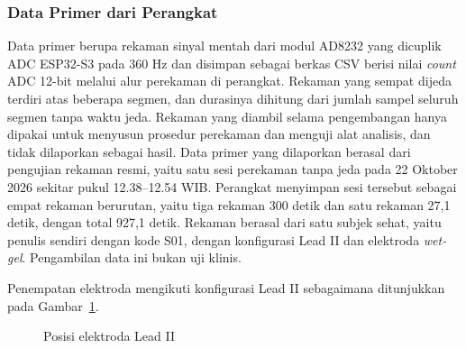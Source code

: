 \subsubsection{Data Primer dari Perangkat}

Data primer berupa rekaman sinyal mentah dari modul AD8232 yang dicuplik ADC ESP32-S3 pada 360 Hz dan disimpan sebagai berkas CSV berisi nilai \textit{count} ADC 12-bit melalui alur perekaman di perangkat. Rekaman yang sempat dijeda terdiri atas beberapa segmen, dan durasinya dihitung dari jumlah sampel seluruh segmen tanpa waktu jeda. Rekaman yang diambil selama pengembangan hanya dipakai untuk menyusun prosedur perekaman dan menguji alat analisis, dan tidak dilaporkan sebagai hasil. Data primer yang dilaporkan berasal dari pengujian rekaman resmi, yaitu satu sesi perekaman tanpa jeda pada 22 Oktober 2026 sekitar pukul 12.38--12.54 WIB. Perangkat menyimpan sesi tersebut sebagai empat rekaman berurutan, yaitu tiga rekaman 300 detik dan satu rekaman 27,1 detik, dengan total 927,1 detik. Rekaman berasal dari satu subjek sehat, yaitu penulis sendiri dengan kode S01, dengan konfigurasi Lead II dan elektroda \textit{wet-gel}. Pengambilan data ini bukan uji klinis.

Penempatan elektroda mengikuti konfigurasi Lead II sebagaimana ditunjukkan pada Gambar~\ref{fig:4-elektroda}.

\begin{figure}[!ht]
  \centering
  \caption{Posisi elektroda Lead II}
  \label{fig:4-elektroda}
\end{figure}

